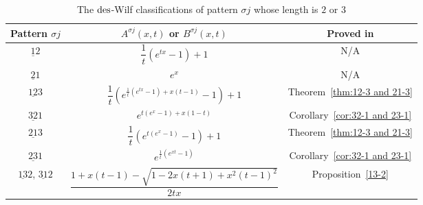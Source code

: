 

\begin{table}[h!]
    \setlength{\tabcolsep}{15pt}    %
    \renewcommand{\arraystretch}{1.2}   %
    \begin{center}
     \begin{tabular}{c|c|c} %
        Pattern $\sigma j$  & $A^{\sigma j}(x,t)$ or $B^{\sigma j}(x,t)$ & Proved in \\ \hline 
        $\underline{1}2$ & $\dfrac{1}{t}(e^{tx}-1)+1$ & N/A  \\ %
        $\underline{2}1$ & $e^{x}$ & N/A  \\ %
        $\underline{12}3$ & $\dfrac{1}{t} (e^{\frac{1}{t}(e^{tx}-1)+x(t-1)}-1)+1$ & Theorem~\ref{thm:12-3 and 21-3} \\ %
        $\underline{32}1$ & $e^{t(e^{x}-1)+x(1-t)}$ & Corollary~\ref{cor:32-1 and 23-1} \\ %
        $\underline{21}3$ & $\dfrac{1}{t} (e^{t(e^x-1)}-1)+1$ & Theorem~\ref{thm:12-3 and 21-3} \\ %
        $\underline{23}1$ & $e^{\frac{1}{t}(e^{xt}-1)}$ &  Corollary~\ref{cor:32-1 and 23-1} \\ %
        $\underline{13}2$, $\underline{31}2$ & $\dfrac{1+x(t-1)-\sqrt{1-2x(t+1)+x^2(t-1)^2}}{2tx}$ &  Proposition~\ref{13-2}
        \end{tabular}
  \end{center}
  \caption{The $\mathrm{des}$-Wilf classifications of pattern $\sigma j$ whose length is $2$ or $3$}
  \label{tab:2 and 3}
\end{table}



